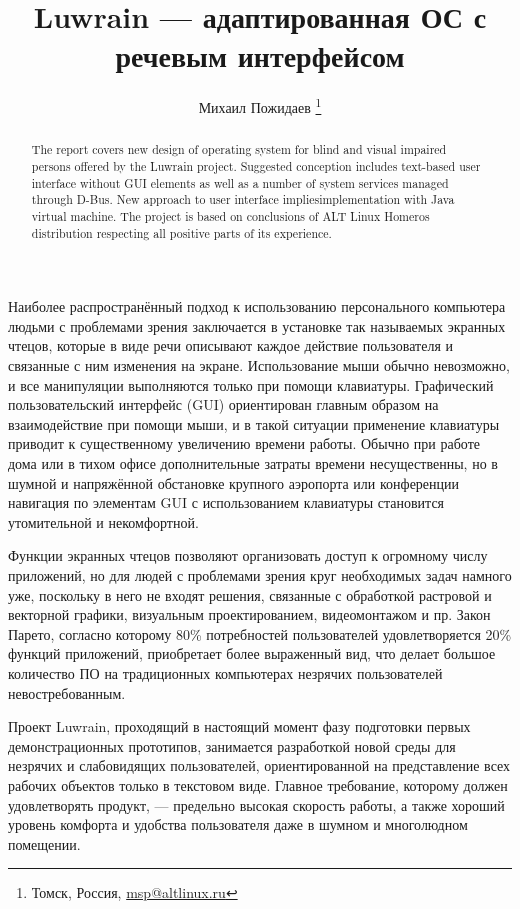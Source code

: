 \documentclass[10pt, a5paper]{article}
\begin{document}
\title{Luwrain — адаптированная ОС с речевым интерфейсом}
\author{Михаил Пожидаев \footnote{Томск, Россия, \url{msp@altlinux.ru}}}
\maketitle
\begin{abstract}
The report covers new design of operating system for blind and visual impaired persons offered by the Luwrain project. Suggested conception includes text-based user interface without GUI elements as well as a number of system services managed through D-Bus. New approach to user interface implies\linebreak implementation with Java virtual machine. The project is based on conclusions of ALT Linux Homeros distribution respecting all positive parts of its experience.
\end{abstract}
Наиболее распространённый подход к использованию персонального компьютера людьми с проблемами зрения заключается в установке так называемых экранных чтецов, которые в виде речи описывают каждое действие пользователя и связанные с ним изменения на экране. Использование мыши обычно невозможно, и все манипуляции выполняются только при помощи клавиатуры. Графический пользовательский интерфейс (GUI) ориентирован главным образом на взаимодействие при помощи мыши, и в такой ситуации применение клавиатуры приводит к существенному увеличению времени работы. Обычно при работе дома или в тихом офисе дополнительные затраты времени несущественны, но в шумной и напряжённой обстановке крупного аэропорта или конференции навигация по элементам GUI с использованием клавиатуры становится утомительной и некомфортной.

Функции экранных чтецов позволяют организовать доступ к огромному числу приложений, но для людей с проблемами зрения круг необходимых задач намного уже, поскольку в него не входят решения, связанные с обработкой растровой и векторной графики, визуальным проектированием, видеомонтажом и пр. Закон Парето, согласно которому 80\% потребностей пользователей удовлетворяется 20\% функций приложений, приобретает более выраженный вид, что делает большое количество ПО на традиционных компьютерах незрячих пользователей невостребованным.

Проект Luwrain, проходящий в настоящий момент фазу подготовки первых демонстрационных прототипов, занимается разработкой новой среды для незрячих и слабовидящих пользователей, ориентированной на представление всех рабочих объектов только в текстовом виде. Главное требование, которому должен удовлетворять продукт, — предельно высокая скорость работы, а также хороший уровень комфорта и удобства пользователя даже в шумном и многолюдном помещении.
\end{document}
